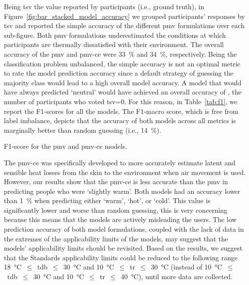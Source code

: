 Being \ac{tsv} the value reported by participants (i.e., ground truth), in Figure~\ref{fig:bar_stacked_model_accuracy} we grouped participants' responses by \ac{tsv} and reported the simple accuracy of the different \ac{pmv} formulations over each sub-figure.
Both \ac{pmv} formulations underestimated the conditions at which participants are thermally dissatisfied with their environment.
The overall accuracy of the \ac{pmv} and \ac{pmv-ce} were \qty{33}{\percent} and \qty{34}{\percent}, respectively.
Being the classification problem unbalanced, the simple accuracy is not an optimal metric to rate the model prediction accuracy since a default strategy of guessing the majority class would lead to a high overall model accuracy.
A model that would have always predicted `neutral' would have achieved an overall accuracy of , the number of participants who voted \ac{tsv}=0.
For this reason, in Table~\ref{tab:f1}, we report the F1-scores for all the models.
The F1-macro score, which is free from label imbalance, depicts that the accuracy of both models across all metrics is marginally better than random guessing (i.e., \qty{14}{\percent}).
\begin{table}[htb!]
    \centering
    
    \caption{F1-score for the \ac{pmv} and \ac{pmv-ce} models.}
    \label{tab:f1}
\end{table}

The \ac{pmv-ce} was specifically developed to more accurately estimate latent and sensible heat losses from the skin to the environment when air movement is used.
However, our results show that the \ac{pmv-ce} is less accurate than the \ac{pmv} in predicting people who were `slightly warm'.
Both models had an accuracy lower than \qty{1}{\percent} when predicting either `warm', `hot', or `cold'.
This value is significantly lower and worse than random guessing, this is very concerning because this means that the models are actively misleading the users.
The low prediction accuracy of both model formulations, coupled with the lack of data in the extremes of the applicability limits of the models, may suggest that the models' applicability limits should be revisited.
Based on the results, we suggest that the Standards applicability limits could be reduced to the following range \qty{18}{\celsius}~$\leq$~\ac{tdb}~$\leq$~\qty{30}{\celsius} and \qty{10}{\celsius}~$\leq$~\ac{tr}~$\leq$~\qty{30}{\celsius} (instead of \qty{10}{\celsius}~$\leq$~\ac{tdb}~$\leq$~\qty{30}{\celsius} and \qty{10}{\celsius}~$\leq$~\ac{tr}~$\leq$~\qty{40}{\celsius}),  until more data are collected. 

